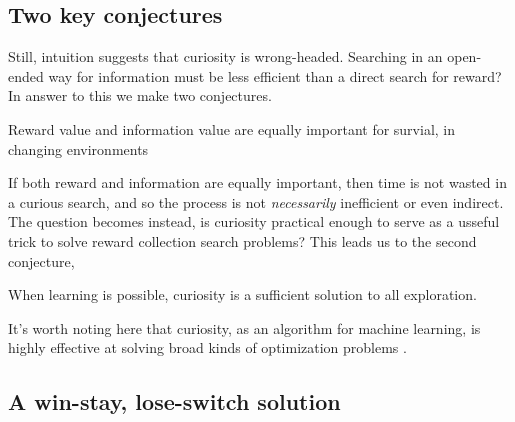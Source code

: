

\subsection{Two key conjectures}

Still, intuition suggests that curiosity is wrong-headed. Searching in an open-ended way for information must be less efficient than a direct search for reward? In answer to this we make two conjectures.

\begin{conjecture}
	Reward value and information value are equally important for survial, in changing environments 
\end{conjecture}

If both reward and information are equally important, then time is not wasted in a curious search, and so the process is not \textit{necessarily} inefficient or even indirect. The question becomes instead, is curiosity practical enough to serve as a usseful trick to solve reward collection search problems? This leads us to the second conjecture,

\begin{conjecture}
	When learning is possible, curiosity is a sufficient solution to all exploration.
\end{conjecture}

It's worth noting here that curiosity, as an algorithm for machine learning, is highly effective at solving broad kinds of optimization problems \cite{Schmidhuber1991,Stanton2018,Lehman2010,Mouret2011,Fister2019,Mouret2015,Colas2020,Cully2015,Pathak2017,Laversanne-Finot2018}. 

\subsection{A win-stay, lose-switch solution}

